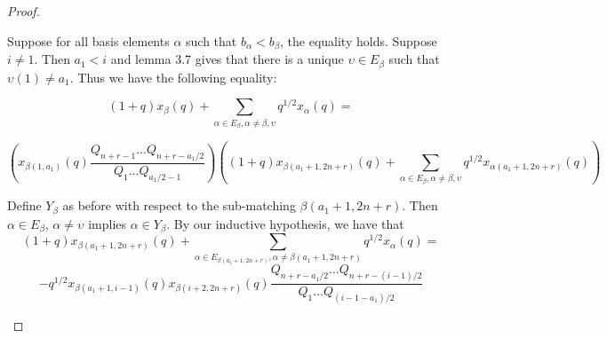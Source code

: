 \documentclass{amsart}
\begin{document}
\begin{proof}
\begin{enumerate}
%	
%	
%	
%	
	
	Suppose for all basis elements $\alpha$ such that $b_\alpha<b_\beta$, the equality holds. Suppose $i\not=1$. Then $a_1<i$ and lemma 3.7 gives that there is a unique $\upsilon\in E_\beta$ such that $\upsilon(1)\not=a_1$. Thus we have the following equality:
	
	$$(1+q)x_\beta(q)+\sum_{\alpha\in E_\beta,\alpha\not=\beta,\upsilon}q^{1/2}x_\alpha(q)=$$
	
	$$(x_{\beta(1,a_1)}(q)\frac{Q_{n+r-1}...Q_{n+r-a_1/2}}{Q_1...Q_{a_1/2-1}})((1+q)x_{\beta(a_1+1,2n+r)}(q)+\sum_{\alpha\in E_\beta,\alpha\not=\beta,\upsilon}q^{1/2}x_{\alpha(a_1+1,2n+r)}(q))$$
	
	Define $Y_\beta$ as before with respect to the sub-matching $\beta(a_1+1,2n+r)$. Then $\alpha\in E_\beta$, $\alpha\not=\upsilon$ implies $\alpha\in Y_\beta$. By our inductive hypothesis, we have that 
	$$(1+q)x_{\beta(a_1+1,2n+r)}(q)+\sum_{\alpha\in E_{\beta(a_1+1,2n+r)},\alpha\not=\beta(a_1+1,2n+r)}q^{1/2}x_{\alpha}(q)=$$
	$$
	-q^{1/2}x_{\beta(a_1+1,i-1)}(q)x_{\beta(i+2,2n+r)}(q)\frac{Q_{n+r-a_1/2}...Q_{n+r-(i-1)/2}}{Q_1...Q_{(i-1-a_1)/2}}$$
	

\end{enumerate}
\end{proof}
\end{document}
